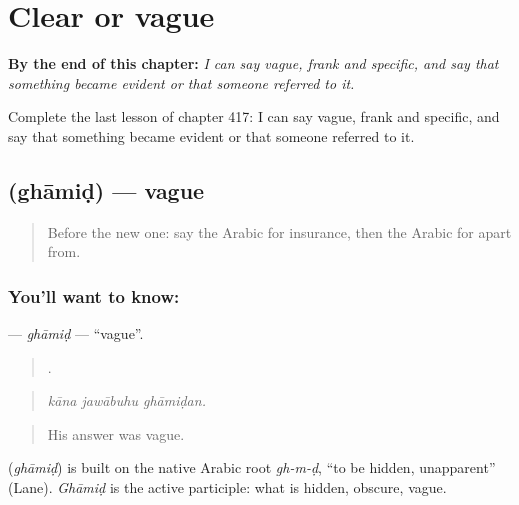 
\chapter{Clear or vague}
\label{ch:ar-clear-or-vague}

\begin{chapteropening}
\textbf{By the end of this chapter:} \emph{I can say vague, frank and specific, and say that something became evident or that someone referred to it.}

Complete the last lesson of chapter 417: I can say vague, frank and specific, and say that something became evident or that someone referred to it.
\end{chapteropening}

\section[\texorpdfstring{\ar{غامض} (ghāmiḍ)}{غامض (ghāmiḍ)}]{ (ghāmiḍ) — vague}

\label{lesson:AR-C417-ghamid}



\begin{quote}
Before the new one: say the Arabic for insurance, then the Arabic for apart from.
\end{quote}

\subsection*{You'll want to know: }
\textbf{} — \emph{ghāmiḍ} — \textquotedblleft{}vague\textquotedblright{}.

\begin{quote}
  .
\end{quote}

\begin{quote}
\emph{kāna jawābuhu ghāmiḍan.}
\end{quote}

\begin{quote}
His answer was vague.
\end{quote}

\begin{cousinweb}
\textbf{} (\emph{ghāmiḍ}) is built on the native Arabic root \emph{gh-m-ḍ}, \textquotedblleft{}to be hidden, unapparent\textquotedblright{} (Lane). \emph{Ghāmiḍ} is the active participle: what is hidden, obscure, vague.
\end{cousinweb}

